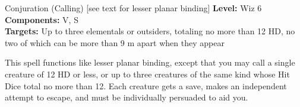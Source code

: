 {Conjuration (Calling) [see text for lesser planar binding]}
{
	\textbf{Level:}
	Wiz 6\\
	\textbf{Components:}
	V, S\\
	\textbf{Targets:}
	Up to three elementals or outsiders, totaling no more than 12 HD, no two of which can be more than 9 m apart when they appear\\
}
{
	This spell functions like lesser planar binding, except that you may call a single creature of 12 HD or less, or up to three creatures of the same kind whose Hit Dice total no more than 12. Each creature gets a save, makes an independent attempt to escape, and must be individually persuaded to aid you.

}
